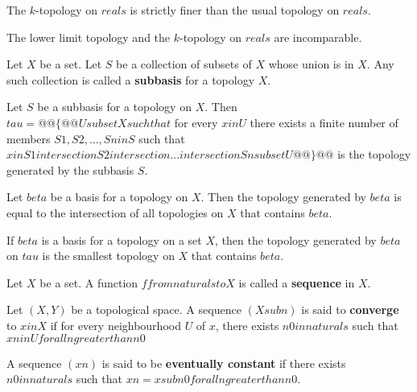\begin{prop}
    The $k$-topology on $reals$ is strictly finer than the usual topology on $reals$.
\end{prop}

\begin{prop}
    The lower limit topology and the $k$-topology on $reals$ are incomparable.
\end{prop}


\begin{defn}
    Let $X$ be a set. Let $S$ be a collection of subsets of $X$ whose union is in $X$. Any such collection is called a \textbf{subbasis} for a topology $X$.
\end{defn}

\begin{thm}
    Let $S$ be a subbasis for a topology on $X$. Then
    \\ $tau = @@\{@@ U subset X such that $ for every $ x in U $ there exists a finite number of members $ S1, S2, ..., Sn in S $ such that $ x in S1 intersection S2 intersection ... intersection Sn subset U @@\}@@$ is the topology generated by the subbasis $S$.
\end{thm}

\begin{thm}
    Let $beta$ be a basis for a topology on $X$. Then the topology generated by $beta$ is equal to the intersection of all topologies on $X$ that contains $beta$.
\end{thm}

\begin{thm}
    If $beta$ is a basis for a topology on a set $X$, then the topology generated by $beta$ on $tau$ is the smallest topology on $X$ that contains $beta$.
\end{thm}

\begin{defn}
    Let $X$ be a set. A function $f from naturals to X$ is called a \textbf{sequence} in $X$.
\end{defn}

\begin{defn}
    Let $(X, Y)$ be a topological space. A sequence $(X sub n)$ is said to \textbf{converge} to $x in X$ if for every neighbourhood $U$ of $x$, there exists $n0 in naturals$ such that $xn in U for all n greater than n0$
\end{defn}

\begin{defn}
    A sequence $(xn)$ is said to be \textbf{eventually constant} if there exists $n0 in naturals$ such that $xn = x sub {n0} for all n greater than n0$.
\end{defn}

